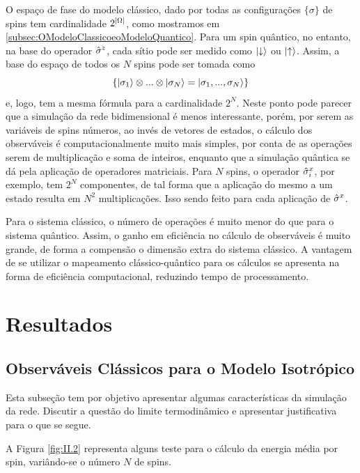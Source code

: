 O espaço de fase do modelo clássico, dado por todas as configurações $\{ \sigma \}$ de spins tem cardinalidade $2^{\abs{\Omega}}$, como mostramos em \ref{subsec:OModeloClassicoeoModeloQuantico}. Para um spin quântico, no entanto, na base do operador $\hat{\sigma}^z$, cada sítio pode ser medido como $\ket{\downarrow}$ ou $\ket{\uparrow}$. Assim, a base do espaço de todos os $N$ spins pode ser tomada como 
\begin{equation*}
	\{ \ket{\sigma_1} \otimes ... \otimes  \ket{ \sigma_N }  = \ket{\sigma_1, ..., \sigma_N}\}
\end{equation*}
e, logo, tem a mesma fórmula para a cardinalidade $2^N$. Neste ponto pode parecer que a simulação da rede bidimensional é menos interessante, porém, por serem as variáveis de spins números, ao invés de vetores de estados, o cálculo dos observáveis é computacionalmente muito mais simples, por conta de as operações serem de multiplicação e soma de inteiros, enquanto que a simulação quântica se dá pela aplicação de operadores matriciais. Para $N$ spins, o operador $\hat{\sigma}^x_i$, por exemplo, tem $2^N$ componentes, de tal forma que a aplicação do mesmo a um estado resulta em $N^2$ multiplicações. Isso sendo feito para cada aplicação de $\hat{\sigma}^x$. 

Para o sistema clássico, o número de operações é muito menor do que para o sistema quântico. Assim, o ganho em eficiência no cálculo de observáveis é muito grande, de forma a compensão o dimensão extra do sistema clássico. A vantagem de se utilizar o mapeamento clássico-quântico para os cálculos se apresenta na forma de eficiência computacional, reduzindo tempo de processamento. 



\section{Resultados}
\label{sec:Resultados}
\subsection{Observáveis Clássicos para o Modelo Isotrópico}
\label{subsec:ObservaveisClassicosParaOModeloIsotropico}

Esta subseção tem por objetivo apresentar algumas características da simulação da rede. Discutir a questão do limite termodinâmico e apresentar justificativa para o que se segue.

A Figura \ref{fig:II.2} representa alguns teste para o cálculo da energia média por spin, variândo-se o número $N$ de spins.

